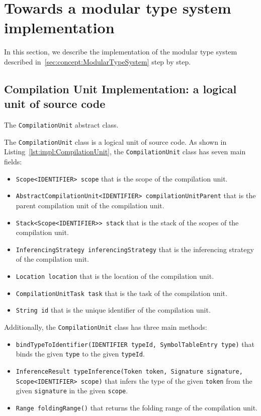\section{Towards a modular type system implementation}\label{sec:impl:ModularTypeSystem}

In this section, we describe the implementation of the modular type system described in~\ref{sec:concept:ModularTypeSystem} step by step.

\subsection{Compilation Unit Implementation: a logical unit of source code}\label{subsec:impl:CompilationUnit}

\begin{Listing}[tbh]
    \centering
    \caption{The \texttt{CompilationUnit} abstract class.}
    \label{lst:impl:CompilationUnit}
\end{Listing}

The \texttt{CompilationUnit} class is a logical unit of source code. As shown in Listing~\ref{lst:impl:CompilationUnit}, the \texttt{CompilationUnit} class has seven main fields:
\begin{itemize}
    \item \texttt{Scope<IDENTIFIER> scope} that is the scope of the compilation unit.
    \item \texttt{AbstractCompilationUnit<IDENTIFIER> compilationUnitParent} that is the parent compilation unit of the compilation unit.
    \item \texttt{Stack<Scope<IDENTIFIER>> stack} that is the stack of the scopes of the compilation unit.
    \item \texttt{InferencingStrategy inferencingStrategy} that is the inferencing strategy of the compilation unit.
    \item \texttt{Location location} that is the location of the compilation unit.
    \item \texttt{CompilationUnitTask task} that is the task of the compilation unit.
    \item \texttt{String id} that is the unique identifier of the compilation unit.
\end{itemize}

Additionally, the \texttt{CompilationUnit} class has three main methods:
\begin{itemize}
    \item \texttt{bindTypeToIdentifier(IDENTIFIER typeId, SymbolTableEntry type)} that binds the given \texttt{type} to the given \texttt{typeId}.
    \item \texttt{InferenceResult typeInference(Token token, Signature signature, Scope<IDENTIFIER> scope)} that infers the type of the given \texttt{token} from the given \texttt{signature} in the given \texttt{scope}.
    \item \texttt{Range foldingRange()} that returns the folding range of the compilation unit.
\end{itemize}


